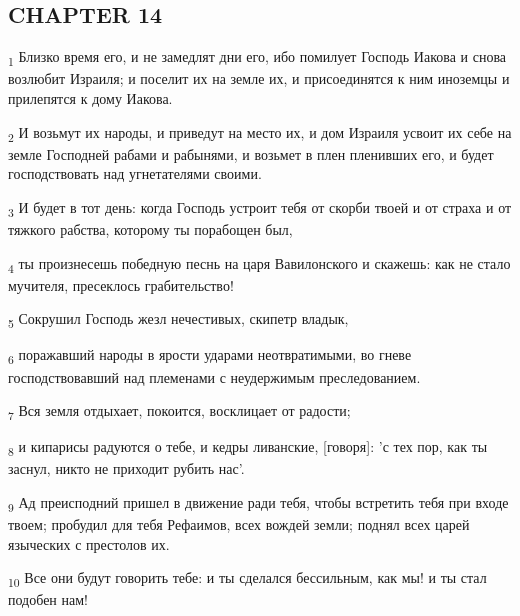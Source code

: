 \subsection{CHAPTER 14}
\begin{tcolorbox}
\textsubscript{1} Близко время его, и не замедлят дни его, ибо помилует Господь Иакова и снова возлюбит Израиля; и поселит их на земле их, и присоединятся к ним иноземцы и прилепятся к дому Иакова.
\end{tcolorbox}
\begin{tcolorbox}
\textsubscript{2} И возьмут их народы, и приведут на место их, и дом Израиля усвоит их себе на земле Господней рабами и рабынями, и возьмет в плен пленивших его, и будет господствовать над угнетателями своими.
\end{tcolorbox}
\begin{tcolorbox}
\textsubscript{3} И будет в тот день: когда Господь устроит тебя от скорби твоей и от страха и от тяжкого рабства, которому ты порабощен был,
\end{tcolorbox}
\begin{tcolorbox}
\textsubscript{4} ты произнесешь победную песнь на царя Вавилонского и скажешь: как не стало мучителя, пресеклось грабительство!
\end{tcolorbox}
\begin{tcolorbox}
\textsubscript{5} Сокрушил Господь жезл нечестивых, скипетр владык,
\end{tcolorbox}
\begin{tcolorbox}
\textsubscript{6} поражавший народы в ярости ударами неотвратимыми, во гневе господствовавший над племенами с неудержимым преследованием.
\end{tcolorbox}
\begin{tcolorbox}
\textsubscript{7} Вся земля отдыхает, покоится, восклицает от радости;
\end{tcolorbox}
\begin{tcolorbox}
\textsubscript{8} и кипарисы радуются о тебе, и кедры ливанские, [говоря]: 'с тех пор, как ты заснул, никто не приходит рубить нас'.
\end{tcolorbox}
\begin{tcolorbox}
\textsubscript{9} Ад преисподний пришел в движение ради тебя, чтобы встретить тебя при входе твоем; пробудил для тебя Рефаимов, всех вождей земли; поднял всех царей языческих с престолов их.
\end{tcolorbox}
\begin{tcolorbox}
\textsubscript{10} Все они будут говорить тебе: и ты сделался бессильным, как мы! и ты стал подобен нам!
\end{tcolorbox}
